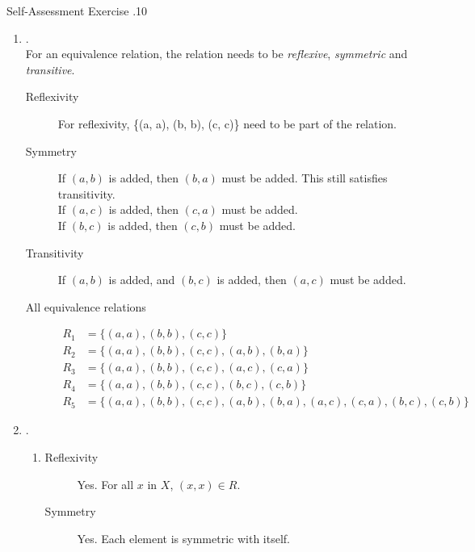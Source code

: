 \documentclass[../notes.tex]{subfiles}
\begin{document}
				\begin{exercise}{Self-Assessment Exercise \thechapter.10}
					\begin{enumerate}
						\item {}.\\
							For an equivalence relation, the relation needs to be \emph{reflexive}, \emph{symmetric} and \emph{transitive}.
							\begin{description}
								\item[Reflexivity] For reflexivity, \{(a, a), (b, b), (c, c)\} need to be part of the relation.
								\item[Symmetry] If $(a, b)$ is added, then $(b, a)$ must be added. This still satisfies transitivity.\\
								If $(a, c)$ is added, then $(c, a)$ must be added.\\
								If $(b, c)$ is added, then $(c, b)$ must be added.
								\item[Transitivity] If $(a, b)$ is added, and $(b, c)$ is added, then $(a, c)$ must be added.
								\item[All equivalence relations]
									\begin{align*}
										R_{1} &= \bigl\{(a, a), (b, b), (c, c)\bigr\}\\
										R_{2} &= \bigl\{(a, a), (b, b), (c, c), (a, b), (b, a)\bigr\}\\
										R_{3} &= \bigl\{(a, a), (b, b), (c, c), (a, c), (c, a)\bigr\}\\
										R_{4} &= \bigl\{(a, a), (b, b), (c, c), (b, c), (c, b)\bigr\}\\
										R_{5} &= \bigl\{(a, a), (b, b), (c, c), (a, b), (b, a), (a, c), (c, a), (b, c), (c, b)\bigr\}
									\end{align*} 
							\end{description}
						\item {}.
							\begin{enumerate}[label=(\alph*)]
								\item {}
									\begin{description}
										\item[Reflexivity] Yes. For all $x$ in $X$, $(x, x) \in R$.
										\item[Symmetry] Yes. Each element is symmetric with itself.

\end{description}
\end{enumerate}
\end{enumerate}
\end{exercise}
\end{document}
